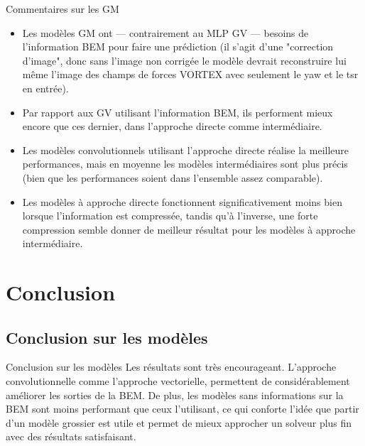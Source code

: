 \documentclass[
11pt,notheorems,hyperref={pdfauthor=whatever}
]{beamer}
\begin{document}
\begin{frame}{Commentaires sur les GM}
    \begin{itemize}
        \item Les modèles GM ont — contrairement au MLP GV — besoins de l'information BEM pour faire une prédiction (il s'agit d'une "correction d'image", donc sans l'image non corrigée le modèle devrait reconstruire lui même l'image des champs de forces VORTEX avec seulement le yaw et le tsr en entrée).
        \item Par rapport aux GV utilisant l'information BEM, ils performent mieux encore que ces dernier, dans l'approche directe comme intermédiaire.
        \item Les modèles convolutionnels utilisant l'approche directe réalise la meilleure performances, mais en moyenne les modèles intermédiaires sont plus précis (bien que les performances soient dans l'ensemble assez comparable).
        \item Les modèles à approche directe fonctionnent significativement moins bien lorsque l'information est compressée, tandis qu'à l'inverse, une forte compression semble donner de meilleur résultat pour les modèles à approche intermédiaire. 
    \end{itemize}
\end{frame}



\section{Conclusion}

\subsection{Conclusion sur les modèles}

\begin{frame}{Conclusion sur les modèles}
    Les résultats sont très encourageant. L'approche convolutionnelle comme l'approche vectorielle, permettent de considérablement améliorer
    les sorties de la BEM. De plus, les modèles sans informations sur la BEM sont moins performant que ceux l'utilisant, ce qui 
    conforte l'idée que partir d'un modèle grossier est utile et permet de mieux approcher un solveur plus fin avec des résultats 
    satisfaisant.
\end{frame}
\end{document}
